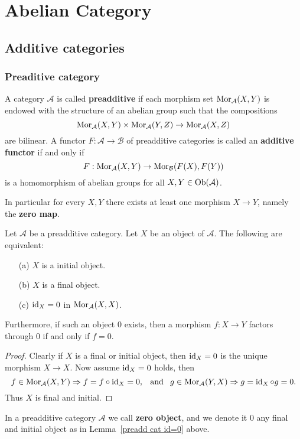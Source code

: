 \section{Abelian Category}
\subsection{Additive categories}
\subsubsection{Preaditive category}
\begin{definition}
A category $\mathcal{A}$ is called \textbf{preadditive} if each morphism set $\mathrm{Mor}_{\mathcal{A}}(X,Y)$ is endowed with the structure of an abelian group such that the compositions
\[\mathrm{Mor}_{\mathcal{A}}(X,Y)\times \mathrm{Mor}_{\mathcal{A}}(Y,Z)\to\mathrm{Mor}_{\mathcal{A}}(X,Z)\]
are bilinear. A functor $F:\mathcal{A}\to\mathcal{B}$ of preadditive categories is called an \textbf{additive functor} if and only if 
\[F:\mathrm{Mor}_{\mathcal{A}}(X,Y)\to\mathrm{Mor}_{\mathcal{B}}(F(X),F(Y))\] 
is a homomorphism of abelian groups for all $X,Y\in\mathrm{Ob}(\mathcal{A})$.
\end{definition}
In particular for every $X,Y$ there exists at least one morphism $X\to Y$, namely the \textbf{zero map}.
\begin{lemma}\label{preadd cat id=0}
Let $\mathcal{A}$ be a preadditive category. Let $X$ be an object of $\mathcal{A}$. The following are equivalent:
\begin{enumerate}
\item[(a)] $X$ is a initial object.
\item[(b)] $X$ is a final object.
\item[(c)] $\operatorname{id}_X=0$ in $\mathrm{Mor}_{\mathcal{A}}(X,X)$.
\end{enumerate}
Furthermore, if such an object $0$ exists, then a morphism $f:X\to Y$ factors through $0$ if and only if $f=0$.
\end{lemma}
\begin{proof}
Clearly if $X$ is a final or initial object, then $\operatorname{id}_X=0$ is the unique morphism $X\to X$. Now assume $\operatorname{id}_X=0$ holds, then \[f\in\mathrm{Mor}_{\mathcal{A}}(X,Y)\Rightarrow f=f\circ\operatorname{id}_X=0,\hspace{8pt}\text{and}\hspace{8pt} g\in\mathrm{Mor}_{\mathcal{A}}(Y,X)\Rightarrow g=\operatorname{id}_X\circ g=0.\] 
Thus $X$ is final and initial.
\end{proof}
\begin{definition}
In a preadditive category $\mathcal{A}$ we call \textbf{zero object}, and we denote it $0$ any final and initial object as in Lemma~\ref{preadd cat id=0} above.
\end{definition}
